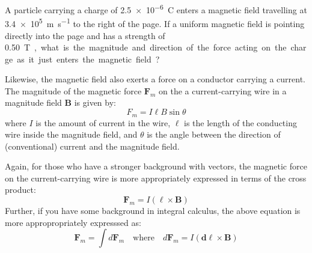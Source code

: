


\begin{example}
  A particle carrying a charge of \SI{2.5e-6}{\coulomb} enters a magnetic field
  travelling at \SI{3.4e5}{\metre\per\second} to the right of the page. If a
  uniform magnetic field is pointing directly into the page and has a strength
  of \SI{.50}\tesla, what is the magnitude and direction of the force acting on
  the charge as it just enters the magnetic field?
  \begin{center}
  \end{center}
\end{example}  
%
%

%
Likewise, the magnetic field also exerts a force on a conductor carrying a
current. The magnitude of the magnetic force $\bm F_m$ on the a
current-carrying wire in a magnitude field $\bm B$ is given by:
\begin{equation}
  \boxed{F_m=I\ell B\sin\theta}
\end{equation}
where $I$ is the amount of current in the wire, $\ell$ is the length of
the conducting wire inside the magnitude field, and $\theta$ is the angle
between the direction of (conventional) current and the magnitude field.
\begin{remark}
  Again, for those who have a stronger background with vectors, the magnetic
  force on the current-carrying wire is more appropriately expressed in terms
  of the cross product:
  \begin{equation*}
    \bm F_m=I(\bm\ell\times\bm B)
  \end{equation*}
  Further, if you have some background in integral calculus, the above equation
  is more appropropriately expresssed as:
  \begin{equation*}
    \bm F_m=\int d\bm F_m \quad\text{where}\quad
    d\bm F_m=I(\bm d\ell\times\bm B)
  \end{equation*}
\end{remark}

